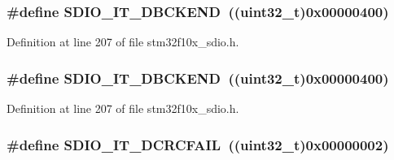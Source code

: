 \subsubsection[{\texorpdfstring{S\+D\+I\+O\+\_\+\+I\+T\+\_\+\+D\+B\+C\+K\+E\+ND}{SDIO_IT_DBCKEND}}]{\setlength{\rightskip}{0pt plus 5cm}\#define S\+D\+I\+O\+\_\+\+I\+T\+\_\+\+D\+B\+C\+K\+E\+ND~(({\bf uint32\+\_\+t})0x00000400)}\hypertarget{group___s_d_i_o___interrupt__sources_gaa1b1fb453a3ce3b10928aaeada2b2186}{}\label{group___s_d_i_o___interrupt__sources_gaa1b1fb453a3ce3b10928aaeada2b2186}


Definition at line 207 of file stm32f10x\+\_\+sdio.\+h.

\subsubsection[{\texorpdfstring{S\+D\+I\+O\+\_\+\+I\+T\+\_\+\+D\+B\+C\+K\+E\+ND}{SDIO_IT_DBCKEND}}]{\setlength{\rightskip}{0pt plus 5cm}\#define S\+D\+I\+O\+\_\+\+I\+T\+\_\+\+D\+B\+C\+K\+E\+ND~(({\bf uint32\+\_\+t})0x00000400)}\hypertarget{group___s_d_i_o___interrupt__sources_gaa1b1fb453a3ce3b10928aaeada2b2186}{}\label{group___s_d_i_o___interrupt__sources_gaa1b1fb453a3ce3b10928aaeada2b2186}


Definition at line 207 of file stm32f10x\+\_\+sdio.\+h.

\subsubsection[{\texorpdfstring{S\+D\+I\+O\+\_\+\+I\+T\+\_\+\+D\+C\+R\+C\+F\+A\+IL}{SDIO_IT_DCRCFAIL}}]{\setlength{\rightskip}{0pt plus 5cm}\#define S\+D\+I\+O\+\_\+\+I\+T\+\_\+\+D\+C\+R\+C\+F\+A\+IL~(({\bf uint32\+\_\+t})0x00000002)}\hypertarget{group___s_d_i_o___interrupt__sources_gaf3321305cb4e24419185a4b92ead299a}{}\label{group___s_d_i_o___interrupt__sources_gaf3321305cb4e24419185a4b92ead299a}


